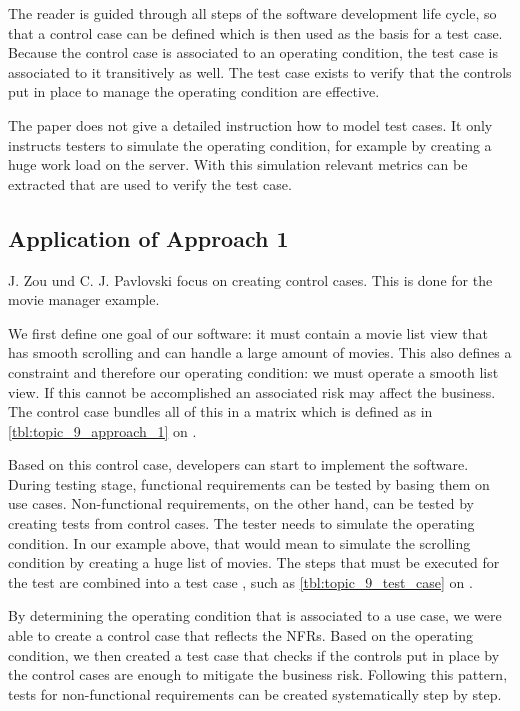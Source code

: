 The reader is guided through all steps of the software development life cycle, so that a control case can be defined which is then used as the basis for a test case. Because the control case is associated to an operating condition, the test case is associated to it transitively as well.
The test case exists to verify that the controls put in place to manage the operating condition are effective.

The paper does not give a detailed instruction how to model test cases. It only instructs testers to simulate the operating condition, for example by creating a huge work load on the server.
With this simulation relevant metrics can be extracted that are used to verify the test case.



\subsection{Application of Approach 1}

J. Zou und C. J. Pavlovski focus on creating control cases. This is done for the movie manager example.

We first define one goal of our software:
it must contain a movie list view that has smooth scrolling and can handle a large amount of movies.
This also defines a constraint and therefore our operating condition: we must operate a smooth list view.
If this cannot be accomplished an associated risk may affect the business. The control case bundles all of this in a matrix which is defined as in \autoref{tbl:topic_9_approach_1} on .

Based on this control case, developers can start to implement the software. During
testing stage, functional requirements can be tested by basing them on use cases. Non-functional requirements, on the other hand, can be tested by creating tests from control cases.
The tester needs to simulate the operating condition.
In our example above, that would mean to simulate the scrolling condition by creating a huge list of movies.
The steps that must be executed for the test are combined into a test case , such as \autoref{tbl:topic_9_test_case} on .

By determining the operating condition that is associated to a use case, we were able to create a control case that reflects the \glspl{NFR}.
Based on the operating condition, we then created a test case that checks if the controls put in place by the control cases are enough to mitigate the business risk.
Following this pattern, tests for non-functional requirements can be created systematically step by step.

